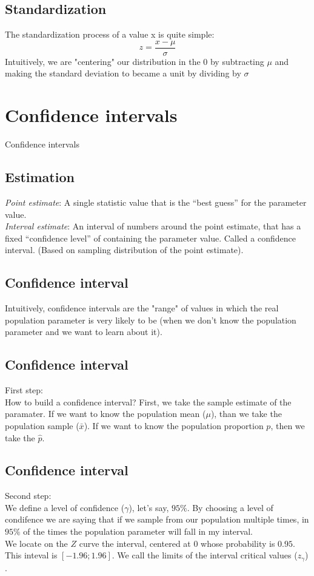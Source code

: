 \documentclass[11pt]{article}
\begin{document}
	\subsection*{Standardization}
	The standardization process of a value x is quite simple:
	\[z=\frac{x - \mu}{\sigma}\]
	Intuitively, we are "centering" our distribution in the 0 by subtracting $\mu$ and making the standard deviation to became a unit by dividing by $\sigma$ 


\section{Confidence intervals}

Confidence intervals

	\subsection*{Estimation}
\emph{Point estimate}: A single statistic value that is the “best guess” for
the parameter value.
\newline\\
\emph{Interval estimate}: An interval of numbers around the point estimate, that has a fixed “confidence level” of containing the parameter value. Called a confidence interval. (Based on sampling distribution of the point estimate).

	\subsection*{Confidence interval}
	Intuitively, confidence intervals are the "range" of values in which the real population parameter is very likely to be (when we don't know the population parameter and we want to learn about it).

	\subsection*{Confidence interval}
	First step:
	\newline\\
	How to build a confidence interval? First, we take the sample estimate of the paramater. If we want to know the population mean ($\mu$), than we take the population sample ($\bar{x}$). If we want to know the population proportion $p$, then we take the $\hat{p}$.

	\subsection*{Confidence interval}
	Second step:
	\newline\\
	We define a level of confidence ($\gamma$), let's say, $95\%$. By choosing a level of condifence we are saying that if we sample from our population multiple times, in $95\%$ of the times the population parameter will fall in my interval.
	\newline\\
	We locate on the $Z$ curve the interval, centered at $0$ whose probability is $0.95$. This inteval is $[-1.96;1.96]$. We call the limits of the interval critical values ($z_\gamma$) .
\end{document}
